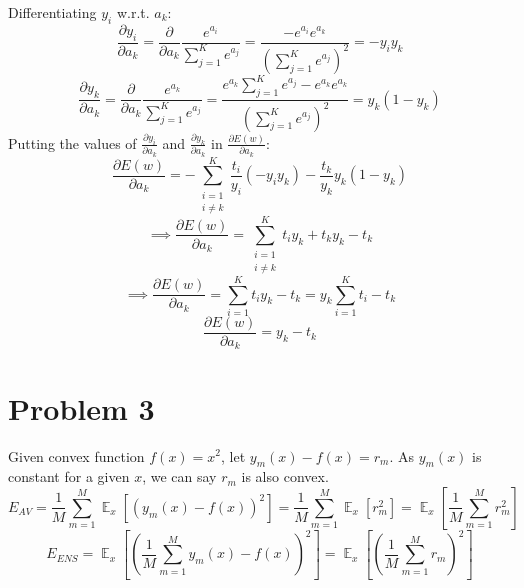 \documentclass[12pt]{article}
\DeclareMathOperator{\E}{\mathbb{E}}
\begin{document}
Differentiating $y_i$ w.r.t. $a_k$:
\begin{equation*}
    \frac{\partial y_i}{\partial a_k} = \frac{\partial}{\partial a_k} \frac{e^{a_i}}{\sum_{j=1}^{K} e^{a_j}} = \frac{ - e^{a_i} e^{a_k}}{(\sum_{j=1}^{K} e^{a_j})^2} = - y_i y_k
\end{equation*}
\begin{equation*}
    \frac{\partial y_k}{\partial a_k} = \frac{\partial}{\partial a_k} \frac{e^{a_k}}{\sum_{j=1}^{K} e^{a_j}} = \frac{e^{a_k} \sum_{j=1}^{K} e^{a_j} - e^{a_k} e^{a_k}}{(\sum_{j=1}^{K} e^{a_j})^2} = y_k (1 - y_k)
\end{equation*}
Putting the values of $\frac{\partial y_i}{\partial a_k}$ and $\frac{\partial y_k}{\partial a_k}$ in $\frac{\partial E(w)}{\partial a_k}$:
\begin{equation*}
    \frac{\partial E(w)}{\partial a_k} = - \sum_{\substack{i=1 \\ i \neq k}}^{K} \frac{t_{i}}{y_{i}} (- y_i y_k) - \frac{t_{k}}{y_{k}} y_k (1 - y_k)
\end{equation*}
\begin{equation*}
    \implies
    \frac{\partial E(w)}{\partial a_k} = \sum_{\substack{i=1 \\ i \neq k}}^{K} t_{i} y_k + t_{k} y_{k} - t_{k}
\end{equation*}
\begin{equation*}
    \implies
    \frac{\partial E(w)}{\partial a_k} = \sum_{i=1}^{K} t_{i} y_k - t_{k} = y_k \sum_{i=1}^{K} t_{i} - t_{k}
\end{equation*}
\begin{equation*}
    \boxed{\frac{\partial E(w)}{\partial a_k} = y_k - t_{k}}
\end{equation*}

\section*{Problem 3}
Given convex function $f(x) = x^2$, let $y_m (x) - f(x) = r_m$. As $y_m (x)$ is constant for a given $x$, we can say $r_m $  is also convex. 
\begin{equation*}
    E_{AV} = \frac{1}{M} \sum_{m=1}^{M} \E_x [(y_m (x) - f(x))^2] = \frac{1}{M} \sum_{m=1}^{M} \E_x [r_m^2] = \E_x [\frac{1}{M} \sum_{m=1}^{M}  r_m^2]
\end{equation*}
\begin{equation*}
    E_{ENS} = \E_x [(\frac{1}{M} \sum_{m=1}^{M} y_m (x) - f(x))^2] = \E_x [(\frac{1}{M} \sum_{m=1}^{M}  r_m)^2]
\end{equation*}
\end{document}
